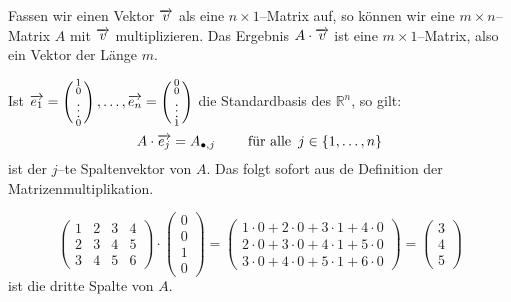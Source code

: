 \begin{notiz}\label{matr_mult_st_basis} Fassen wir einen Vektor $\overrightarrow{v}$ 
als eine $n \times 1$--Matrix auf, so können wir eine $m \times n$--Matrix $A$ mit 
$\overrightarrow{v}$ multiplizieren. Das Ergebnis $A \cdot \overrightarrow{v}$ ist eine 
$m \times 1$--Matrix, also ein Vektor der Länge $m$.

Ist $\overrightarrow{e_1} = \left( \begin{smallmatrix} 1 \\ 0 \\ \vdots \\ 0 
\end{smallmatrix}\right), \ldots, \overrightarrow{e_n} = \left( \begin{smallmatrix} 
0 \\ 0 \\ \vdots \\ 1 \end{smallmatrix}\right)$ die Standardbasis des $\mathbb R^n$, 
so gilt:
  	$$ A \cdot \overrightarrow{e_j} = A_{\bullet, j} \qquad \textrm{ für alle } \, 
     	j \in \{1, \ldots, n \} $$
ist der $j$--te Spaltenvektor von $A$. Das folgt sofort aus de Definition der 
Matrizenmultiplikation.
\end{notiz}

\begin{beispiel}
 	$$ \left( \begin{matrix} 1 & 2 & 3 & 4 \\ 2 & 3 & 4 & 5 \\ 3 & 4 & 5 & 6 
    	\end{matrix} \right) \cdot \left( \begin{matrix} 0 \\ 0 \\ 1 \\ 0 \end{matrix} 
    	\right) = \left( \begin{matrix} 1 \cdot 0 + 2 \cdot 0 + 3 \cdot 1 + 4 \cdot 0 \\ 
    	2 \cdot 0 + 3 \cdot 0 + 4 \cdot 1 + 5 \cdot 0 \\ 3 \cdot 0 + 4 \cdot 0 + 5 \cdot 1 + 
    	6 \cdot 0 \end{matrix} \right)
    	= \left( \begin{matrix} 3 \\ 4 \\ 5 \end{matrix} \right) $$
ist die dritte Spalte von $A$.
\end{beispiel}
           
